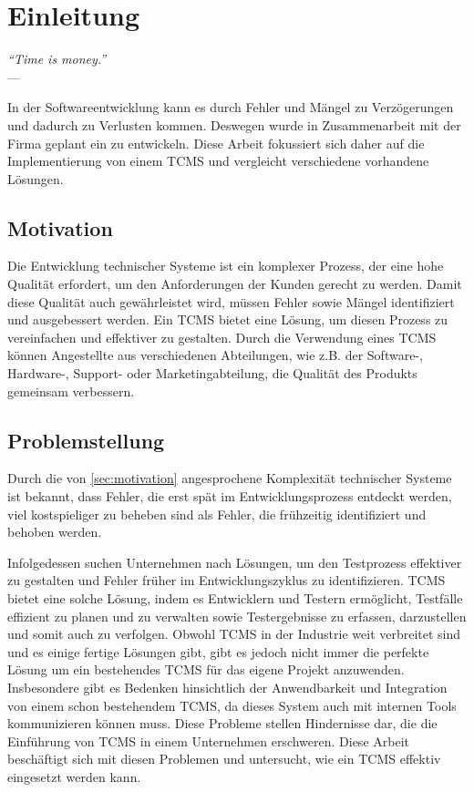 \documentclass[a4paper, fontsize=11pt, parskip=half, twoside]{scrreprt}
\begin{document}
	
	
	\clearpage
	\chapter{Einleitung}
	
	\begin{flushright}
		\rightskip=8cm\textit{``Time is money.''} \\
		\vspace{.2em}
		\rightskip=6cm--- \textcite{franklin_advice_1748}
	\end{flushright}

	In der Softwareentwicklung kann es durch Fehler und Mängel zu Verzögerungen und dadurch zu Verlusten kommen.
	Deswegen wurde in Zusammenarbeit mit der Firma  geplant ein  zu entwickeln.
	Diese Arbeit fokussiert sich daher auf die Implementierung von einem \ac{TCMS} und vergleicht verschiedene vorhandene Lösungen.
	
	
	\section{Motivation} \label{sec:motivation}
	Die Entwicklung technischer Systeme ist ein komplexer Prozess, der eine hohe Qualität erfordert, um den Anforderungen der Kunden gerecht zu werden. 
	Damit diese Qualität auch gewährleistet wird, müssen Fehler sowie Mängel identifiziert und ausgebessert werden. 
	Ein \ac{TCMS} bietet eine Lösung, um diesen Prozess zu vereinfachen und effektiver zu gestalten. 
	Durch die Verwendung eines \ac{TCMS} können Angestellte aus verschiedenen Abteilungen, wie z.B. der Software-, Hardware-, Support- oder Marketingabteilung, die Qualität des Produkts gemeinsam verbessern. 
	
	\section{Problemstellung}
	Durch die von \autoref{sec:motivation} angesprochene Komplexität technischer Systeme ist bekannt, dass Fehler, die erst spät im Entwicklungsprozess entdeckt werden, viel kostspieliger zu beheben sind als Fehler, die frühzeitig identifiziert und behoben werden. \textcite{westland_cost_2002}
	
	Infolgedessen suchen Unternehmen nach Lösungen, um den Testprozess effektiver zu gestalten und Fehler früher im Entwicklungszyklus zu identifizieren. 
	\ac{TCMS} bietet eine solche Lösung, indem es Entwicklern und Testern ermöglicht, Testfälle effizient zu planen und zu verwalten sowie Testergebnisse zu erfassen, darzustellen und somit auch zu verfolgen. 
	Obwohl \ac{TCMS} in der Industrie weit verbreitet sind und es einige fertige Lösungen gibt, gibt es jedoch nicht immer die perfekte Lösung um ein bestehendes \ac{TCMS} für das eigene Projekt anzuwenden. 
	Insbesondere gibt es Bedenken hinsichtlich der Anwendbarkeit und Integration von einem schon bestehendem \ac{TCMS}, da dieses System auch mit internen Tools kommunizieren können muss.
	Diese Probleme stellen Hindernisse dar, die die Einführung von \ac{TCMS} in einem Unternehmen erschweren. 
	Diese Arbeit beschäftigt sich mit diesen Problemen und untersucht, wie ein \ac{TCMS} effektiv eingesetzt werden kann.
	
\end{document}

